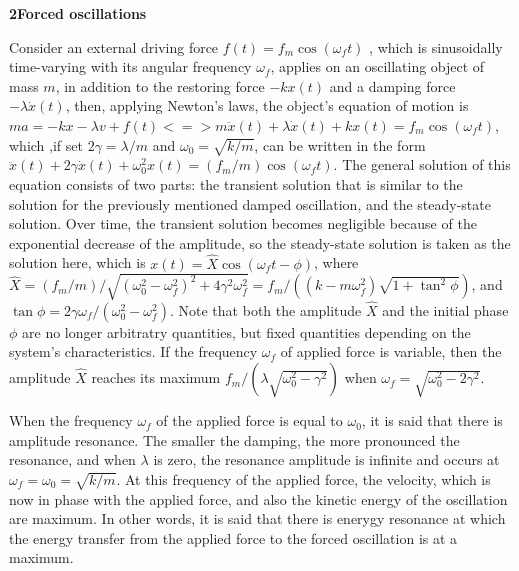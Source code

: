 \documentclass[a4paper,12pt,oneside]{report}
\newenvironment{tree}[4]{
\begin{list}{#1}{\parskip=0in \topsep=0in \itemsep=0in \parsep=0in \partopsep=0in \leftmargin=#2 \rightmargin=#3 \itemindent=#4 \listparindent=\itemindent}
}{\end{list}}
\newenvironment{ssection}[5]{
\phantom{#1}\textbf{#2\space#3}
\begin{tree}{#4}{0in}{0in}{#5}
}{\end{tree}}
\begin{document}
\begin{ssection}{\space}{2}{Forced oscillations}{\textbullet}{\parindent}
\item Consider an external driving force $f(t)=f_{m}\cos(\omega_{f}t)$ , which is sinusoidally time-varying with its angular frequency $\omega_{f}$, applies on an oscillating object of mass $m$, in addition to the restoring force $-kx(t)$ and a damping force $-\lambda\dot{x}(t)$, then, applying Newton's laws, the object's equation of motion is $ma=-kx-\lambda v+f(t)<=>m\ddot{x}(t)+\lambda\dot{x}(t)+kx(t)=f_{m}\cos(\omega_{f}t)$, which ,if set $2\gamma=\lambda/m$ and $\omega_{0}=\sqrt{k/m}$, can be written in the form $\ddot{x}(t)+2\gamma\dot{x}(t)+\omega_{0}^{2}x(t)=(f_{m}/m)\cos(\omega_{f}t)$. The general solution of this equation consists of two parts: the transient solution that is similar to the solution for the previously mentioned damped oscillation, and the steady-state solution. Over time, the transient solution becomes negligible because of the exponential decrease of the amplitude, so the steady-state solution is taken as the solution here, which is $x(t)=\hat{X}\cos(\omega_{f}t-\phi)$, where $\hat{X}=(f_{m}/m)/\sqrt{(\omega_{0}^{2}-\omega_{f}^{2})^{2}+4\gamma^{2}\omega_{f}^{2}}=f_{m}/\left((k-m\omega_{f}^{2})\sqrt{1+\tan^{2}\phi}\right)$, and $\tan\phi=2\gamma\omega_{f}/(\omega_{0}^{2}-\omega_{f}^{2})$. Note that both the amplitude $\hat{X}$ and the initial phase $\phi$ are no longer arbitratry quantities, but fixed quantities depending on the system's characteristics. If the frequency $\omega_{f}$ of applied force is variable, then the amplitude $\hat{X}$ reaches its maximum $f_{m}/(\lambda\sqrt{\omega_{0}^{2}-\gamma^{2}})$ when $\omega_{f}=\sqrt{\omega_{0}^{2}-2\gamma^{2}}$.
\item When the frequency $\omega_{f}$ of the applied force is equal to $\omega_{0}$, it is said that there is amplitude resonance. The smaller the damping, the more pronounced the resonance, and when $\lambda$ is zero, the resonance amplitude is infinite and occurs at $\omega_{f}=\omega_{0}=\sqrt{k/m}$. At this frequency of the applied force, the velocity, which is now in phase with the applied force, and also the kinetic energy of the oscillation are maximum. In other words, it is said that there is enerygy resonance at which the energy transfer from the applied force to the forced oscillation is at a maximum. 
\end{ssection}
\end{document}
